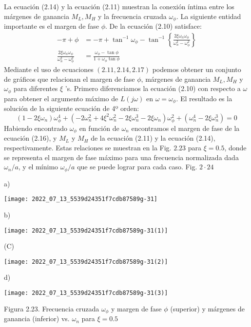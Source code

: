 La ecuación (2.14) y la ecuación (2.11) muestran la conexión íntima entre los márgenes de ganancia $M_{L}, M_{H}$ y la frecuencia cruzada $\omega_{\phi}$. La siguiente entidad importante es el margen de fase $\phi$. De la ecuación (2.10) satisface:
$$
\begin{aligned}
-\pi+\phi &=-\pi+\tan ^{-1} \omega_{\phi}-\tan ^{-1}\left\{\frac{2 \xi \omega_{n} \omega_{\phi}}{\omega_{n}^{2}-\omega_{\phi}^{2}}\right\} \\
\frac{2 \xi \omega_{n} \omega_{\phi}}{\omega_{n}^{2}-\omega_{\phi}^{2}} &=\frac{\omega_{\phi}-\tan \phi}{1+\omega_{\phi} \tan \phi}
\end{aligned}
$$
Mediante el uso de ecuaciones $(2.11,2.14,2.17)$ podemos obtener un conjunto de gráficos que relacionan el margen de fase $\phi$, márgenes de ganancia $M_{L}, M_{H}$ y $\omega_{\phi}$ para diferentes $\xi$ 's. Primero diferenciamos la ecuación (2.10) con respecto a $\omega$ para obtener el argumento máximo de $L(j \omega)$ en $\omega=\omega_{\phi}$. El resultado es la solución de la siguiente ecuación de 4º orden:
$$
\left(1-2 \xi \omega_{n}\right) \omega_{\phi}^{4}+\left(-2 \omega_{n}^{2}+4 \xi^{2} \omega_{n}^{2}-2 \xi \omega_{n}^{3}-2 \xi \omega_{n}\right) \omega_{\phi}^{2}+\left(\omega_{n}^{4}-2 \xi \omega_{n}^{3}\right)=0
$$
Habiendo encontrado $\omega_{\phi}$ en función de $\omega_{n}$ encontramos el margen de fase de la ecuación (2.16), y $M_{L}$ y $M_{H}$ de la ecuación (2.11) y la ecuación (2.14), respectivamente. Estas relaciones se muestran en la Fig. $2.23$ para $\xi=0.5$, donde se representa el margen de fase máximo para una frecuencia normalizada dada $\omega_{n} / a$, y el mínimo $\omega_{\phi} / a$ que se puede lograr para cada caso. Fig. $2 \cdot 24$

a)

\texttt{[image: 2022\_07\_13\_5539d24351f7cdb87589g-31]}

b)

\texttt{[image: 2022\_07\_13\_5539d24351f7cdb87589g-31(1)]}

(C)

\texttt{[image: 2022\_07\_13\_5539d24351f7cdb87589g-31(2)]}

d)

\texttt{[image: 2022\_07\_13\_5539d24351f7cdb87589g-31(3)]}

Figura 2.23. Frecuencia cruzada $\omega_{\phi}$ y margen de fase $\phi$ (superior) y márgenes de ganancia (inferior) vs. $\omega_{n}$ para $\xi=0.5$

